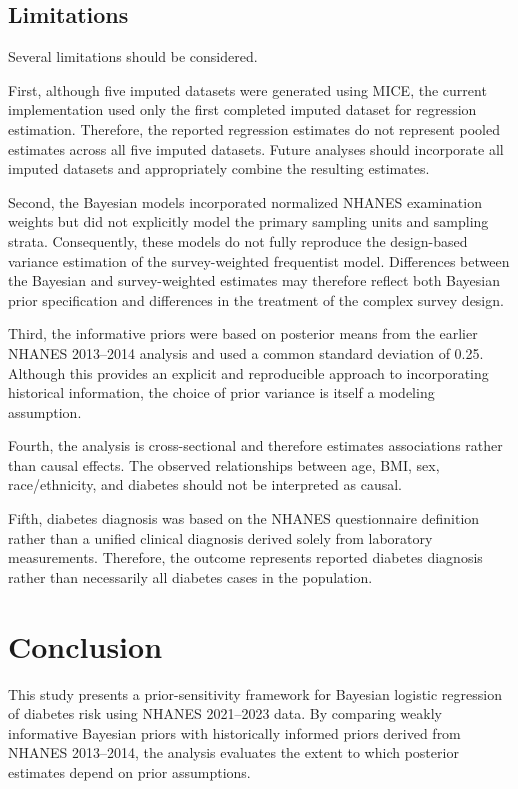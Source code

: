 \documentclass[12pt]{article}
\begin{document}
\subsection{Limitations}

Several limitations should be considered.

First, although five imputed datasets were generated using MICE, the current implementation used only the first completed imputed dataset for regression estimation. Therefore, the reported regression estimates do not represent pooled estimates across all five imputed datasets. Future analyses should incorporate all imputed datasets and appropriately combine the resulting estimates.

Second, the Bayesian models incorporated normalized NHANES examination weights but did not explicitly model the primary sampling units and sampling strata. Consequently, these models do not fully reproduce the design-based variance estimation of the survey-weighted frequentist model. Differences between the Bayesian and survey-weighted estimates may therefore reflect both Bayesian prior specification and differences in the treatment of the complex survey design.

Third, the informative priors were based on posterior means from the earlier NHANES 2013--2014 analysis and used a common standard deviation of 0.25. Although this provides an explicit and reproducible approach to incorporating historical information, the choice of prior variance is itself a modeling assumption.

Fourth, the analysis is cross-sectional and therefore estimates associations rather than causal effects. The observed relationships between age, BMI, sex, race/ethnicity, and diabetes should not be interpreted as causal.

Fifth, diabetes diagnosis was based on the NHANES questionnaire definition rather than a unified clinical diagnosis derived solely from laboratory measurements. Therefore, the outcome represents reported diabetes diagnosis rather than necessarily all diabetes cases in the population.


\section{Conclusion}

This study presents a prior-sensitivity framework for Bayesian logistic regression of diabetes risk using NHANES 2021--2023 data. By comparing weakly informative Bayesian priors with historically informed priors derived from NHANES 2013--2014, the analysis evaluates the extent to which posterior estimates depend on prior assumptions.
\end{document}
